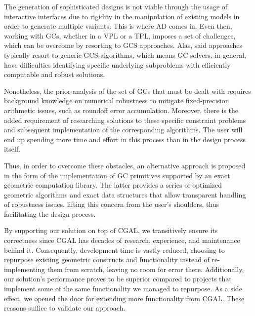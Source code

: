 %
\label{chap:conclusion}
\cleardoublepage{}

\noindent The generation of sophisticated designs is not viable through the
usage of interactive interfaces due to rigidity in the manipulation of existing
models in order to generate multiple variants.  This is where \ac{AD} comes in.
Even then, working with \acp{GC}, whether in a \ac{VPL} or a \ac{TPL}, imposes a
set of challenges, which can be overcome by resorting to \ac{GCS} approaches.
Alas, said approaches typically resort to generic \acs{GCS} algorithms, which
means \ac{GC} solvers, in general, have difficulties identifying specific
underlying subproblems with efficiently computable and robust solutions.

Nonetheless, the prior analysis of the set of \acp{GC} that must be
dealt with requires background knowledge on numerical robustness to mitigate
fixed-precision arithmetic issues, such as roundoff error accumulation.
Moreover, there is the added requirement of researching solutions to these
specific constraint problems and subsequent implementation of the corresponding
algorithms.  The user will end up spending more time and effort in this process
than in the design process itself.

Thus, in order to overcome these obstacles, an alternative approach is proposed
in the form of the implementation of \ac{GC} primitives supported by an exact
geometric computation library.  The latter provides a series of optimized
geometric algorithms and exact data structures that allow transparent handling
of robustness issues, lifting this concern from the user's shoulders, thus
facilitating the design process.

By supporting our solution on top of \ac{CGAL}, we transitively ensure its
correctness since \ac{CGAL} has decades of research, experience, and maintenance
behind it.  Consequently, development time is vastly reduced, choosing to
repurpose existing geometric constructs and functionality instead of
re-implementing them from scratch, leaving no room for error there.
Additionally, our solution's performance proves to be superior compared to
projects that implement some of the same functionality we managed to repurpose.
As a side effect, we opened the door for extending more functionality from
\ac{CGAL}.  These reasons suffice to validate our approach.

